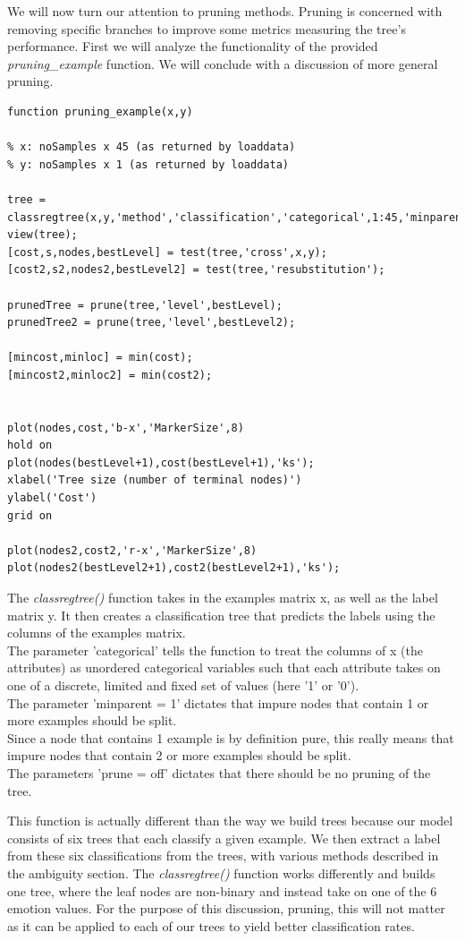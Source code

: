 We will now turn our attention to pruning methods. Pruning is concerned with removing specific branches to improve some metrics measuring
the tree's performance. First we will analyze the functionality of the provided \emph{pruning\_example} function.
We will conclude with a discussion of more general pruning.



\lstset{language=matlab}

\begin{lstlisting}
function pruning_example(x,y)
    
% x: noSamples x 45 (as returned by loaddata)
% y: noSamples x 1 (as returned by loaddata)

tree = classregtree(x,y,'method','classification','categorical',1:45,'minparent',1,'prune','off');
view(tree);
[cost,s,nodes,bestLevel] = test(tree,'cross',x,y);
[cost2,s2,nodes2,bestLevel2] = test(tree,'resubstitution');

prunedTree = prune(tree,'level',bestLevel);
prunedTree2 = prune(tree,'level',bestLevel2);

[mincost,minloc] = min(cost);
[mincost2,minloc2] = min(cost2);


plot(nodes,cost,'b-x','MarkerSize',8)
hold on
plot(nodes(bestLevel+1),cost(bestLevel+1),'ks');
xlabel('Tree size (number of terminal nodes)')
ylabel('Cost')
grid on

plot(nodes2,cost2,'r-x','MarkerSize',8)
plot(nodes2(bestLevel2+1),cost2(bestLevel2+1),'ks');
\end{lstlisting}

The \emph{classregtree()} function takes in the examples matrix x, as well as the label matrix y.
It then creates a classification tree that predicts the labels using the columns of the examples matrix.\\
The parameter 'categorical' tells the function to treat the columns of x (the attributes) as unordered categorical variables
such that each attribute takes on one of a discrete, limited and fixed set of values (here '1' or '0').\\
The parameter 'minparent = 1' dictates that impure nodes that contain 1 or more examples should be split.\\
Since a node that contains 1 example is by definition pure,
this really means that impure nodes that contain 2 or more examples should be split.\\
The parameters 'prune = off' dictates that there should be no pruning of the tree.

This function is actually different than the way we build trees because our model consists of six trees that each classify a given
example.
We then extract a label from these six classifications from the trees, with various methods described in the ambiguity section.
The \emph{classregtree()} function works differently and builds one tree,
where the leaf nodes are non-binary and instead take on one of the 6 emotion values.
For the purpose of this discussion, pruning,
this will not matter as it can be applied to each of our trees to yield better classification rates.

